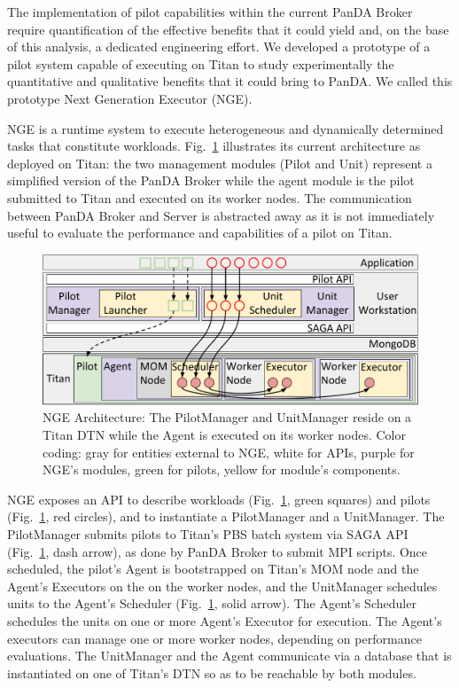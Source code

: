 \documentclass[conference]{IEEEtran}
\begin{document}
The implementation of pilot capabilities within the current PanDA Broker require
quantification of the effective benefits that it could yield and, on the base of
this analysis, a dedicated engineering effort. We developed a prototype of a
pilot system capable of executing on Titan to study experimentally the
quantitative and qualitative benefits that it could bring to PanDA. We called
this prototype Next Generation Executor (NGE).

NGE is a runtime system to execute heterogeneous and dynamically determined
tasks that constitute workloads. Fig.~\ref{fig:arch-overview} illustrates its
current architecture as deployed on Titan: the two management modules (Pilot
and Unit) represent a simplified version of the PanDA Broker while the agent
module is the pilot submitted to Titan and executed on its worker nodes. The
communication between PanDA Broker and Server is abstracted away as it
is not immediately useful to evaluate the performance and capabilities of a
pilot on Titan.

\begin{figure}
  \centering
   \includegraphics[width=\columnwidth]{rp_architecture_compact_atlaswms_paper.pdf}
  \caption{NGE Architecture: The PilotManager and  UnitManager reside on a Titan
  DTN while the Agent is executed on its worker nodes. Color coding: gray for
  entities external to NGE, white for APIs, purple for NGE's modules, green for
  pilots, yellow for module's components.}
\label{fig:arch-overview}
\end{figure}

NGE exposes an API to describe workloads (Fig.~\ref{fig:arch-overview}, green
squares) and pilots (Fig.~\ref{fig:arch-overview}, red circles), and to
instantiate a PilotManager and a UnitManager.   The PilotManager submits
pilots to Titan's PBS  batch system via SAGA API (Fig.~\ref{fig:arch-overview}, dash arrow), as done by PanDA Broker to submit MPI scripts. Once
scheduled, the pilot's Agent is bootstrapped on Titan's MOM node and
the Agent's Executors on the on the worker
nodes, and the UnitManager schedules units to the Agent's Scheduler
(Fig.~\ref{fig:arch-overview}, solid arrow). The Agent's Scheduler schedules
the units on one or more Agent's Executor for execution. The Agent's executors
can manage one or more worker nodes, depending on performance evaluations. The
UnitManager and the Agent communicate via a database that is instantiated on
one of Titan's DTN so as to be reachable by both modules.
\end{document}
